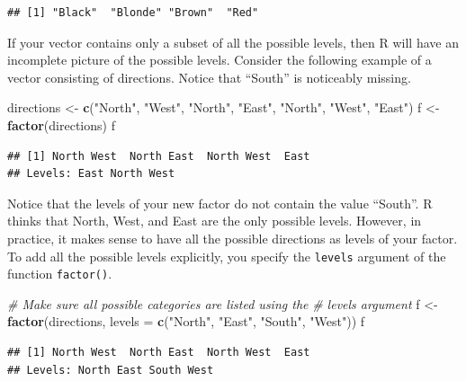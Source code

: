 \documentclass[
]{book}
\newenvironment{Shaded}{\begin{snugshade}}{\end{snugshade}}
\newcommand{\CommentTok}[1]{\textcolor[rgb]{0.56,0.35,0.01}{\textit{#1}}}
\newcommand{\DataTypeTok}[1]{\textcolor[rgb]{0.13,0.29,0.53}{#1}}
\newcommand{\KeywordTok}[1]{\textcolor[rgb]{0.13,0.29,0.53}{\textbf{#1}}}
\newcommand{\NormalTok}[1]{#1}
\newcommand{\StringTok}[1]{\textcolor[rgb]{0.31,0.60,0.02}{#1}}
\begin{document}
\begin{verbatim}
## [1] "Black"  "Blonde" "Brown"  "Red"
\end{verbatim}

If your vector contains only a subset of all the possible levels, then R will have an incomplete picture of the possible levels. Consider the following example of a vector consisting of directions. Notice that ``South'' is noticeably missing.

\begin{Shaded}
\begin{Highlighting}[]
\NormalTok{directions <-}\StringTok{ }\KeywordTok{c}\NormalTok{(}\StringTok{"North"}\NormalTok{, }\StringTok{"West"}\NormalTok{, }\StringTok{"North"}\NormalTok{, }\StringTok{"East"}\NormalTok{, }\StringTok{"North"}\NormalTok{, }\StringTok{"West"}\NormalTok{,}
    \StringTok{"East"}\NormalTok{)}
\NormalTok{f <-}\StringTok{ }\KeywordTok{factor}\NormalTok{(directions)}
\NormalTok{f}
\end{Highlighting}
\end{Shaded}

\begin{verbatim}
## [1] North West  North East  North West  East 
## Levels: East North West
\end{verbatim}

Notice that the levels of your new factor do not contain the value ``South''. R thinks that North, West, and East are the only possible levels. However, in practice, it makes sense to have all the possible directions as levels of your factor. To add all the possible levels explicitly, you specify the \texttt{levels} argument of the function \texttt{factor()}.

\begin{Shaded}
\begin{Highlighting}[]
\CommentTok{# Make sure all possible categories are listed using the}
\CommentTok{# levels argument}
\NormalTok{f <-}\StringTok{ }\KeywordTok{factor}\NormalTok{(directions, }\DataTypeTok{levels =} \KeywordTok{c}\NormalTok{(}\StringTok{"North"}\NormalTok{, }\StringTok{"East"}\NormalTok{, }\StringTok{"South"}\NormalTok{,}
    \StringTok{"West"}\NormalTok{))}
\NormalTok{f}
\end{Highlighting}
\end{Shaded}

\begin{verbatim}
## [1] North West  North East  North West  East 
## Levels: North East South West
\end{verbatim}
\end{document}
